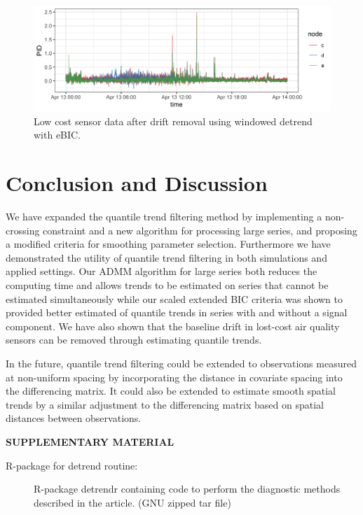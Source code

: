 \documentclass[12pt]{article}
\begin{document}
	\begin{figure}
		\includegraphics[width = \linewidth]{Figures/corrected_data.png}
		\caption{Low cost sensor data after drift removal using windowed detrend with eBIC.}		
	\end{figure}

		
	

	\section{Conclusion and Discussion}
	We have expanded the quantile trend filtering method by implementing a non-crossing constraint and a new algorithm for processing large series, and proposing a modified criteria for smoothing parameter selection. Furthermore we have demonstrated the utility of quantile trend filtering in both simulations and applied settings. Our ADMM algorithm for large series both reduces the computing time and allows trends to be estimated on series that cannot be estimated simultaneously while our scaled extended BIC criteria was shown to provided better estimated of quantile trends in series with and without a signal component. We have also shown that the baseline drift in lost-cost air quality sensors can be removed through estimating quantile trends.
	 
	In the future, quantile trend filtering could be extended to observations measured at non-uniform spacing by incorporating the distance in covariate spacing into the differencing matrix. It could also be extended to estimate smooth spatial trends by a similar adjustment to the differencing matrix based on spatial distances between observations. 
	
	\label{sec:conc}
	
	
	\bigskip
	\begin{center}
		{\large\bf SUPPLEMENTARY MATERIAL}
	\end{center}
	
	\begin{description}
		
		\item[R-package for detrend routine:] R-package detrendr containing code to perform the diagnostic methods described in the article. (GNU zipped tar file)
				
	\end{description}
	
	
	
	
	
\end{document}
